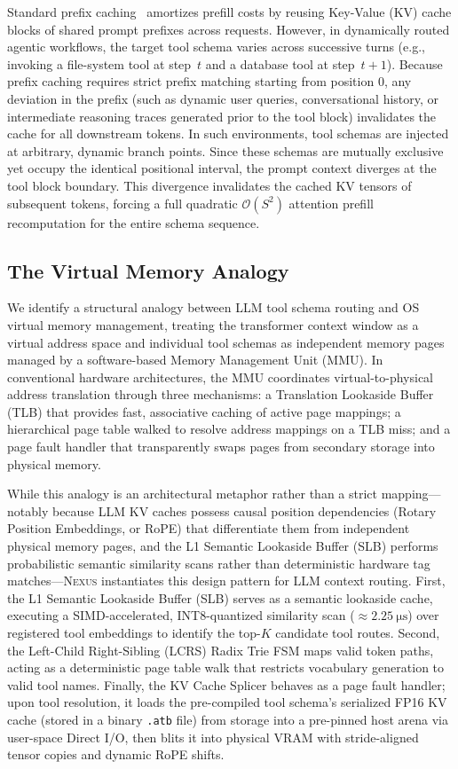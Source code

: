 \documentclass[conference,10pt]{IEEEtran}
\newcommand{\Nexus}{\textsc{Nexus}\xspace}
\newcommand{\atb}{\texttt{.atb}\xspace}
\begin{document}
Standard prefix caching~\cite{kwon2023vllm,zheng2024sglang} amortizes prefill
costs by reusing Key-Value (KV) cache blocks of shared prompt prefixes across requests.
However, in dynamically routed agentic workflows, the target tool schema varies
across successive turns (e.g., invoking a file-system tool at step~$t$ and a
database tool at step~$t{+}1$). Because prefix caching requires strict prefix matching starting from position 0, any deviation in the prefix (such as dynamic user queries, conversational history, or intermediate reasoning traces generated prior to the tool block) invalidates the cache for all downstream tokens. In such environments, tool schemas are injected at arbitrary, dynamic branch points. Since these schemas are mutually exclusive yet occupy the identical positional interval, the prompt context diverges at the tool block boundary. This divergence invalidates the cached KV tensors of subsequent tokens, forcing a full quadratic $\mathcal{O}(S^2)$ attention prefill recomputation for the entire schema sequence.

\subsection{The Virtual Memory Analogy}
\label{subsec:vm-analogy}

We identify a structural analogy between LLM tool schema routing and OS virtual memory
management, treating the transformer context window as a virtual address space and
individual tool schemas as independent memory pages managed by a software-based Memory
Management Unit (MMU). In conventional hardware architectures, the MMU coordinates
virtual-to-physical address translation through three mechanisms: a Translation Lookaside
Buffer (TLB) that provides fast, associative caching of active page mappings; a
hierarchical page table walked to resolve address mappings on a TLB miss; and a page
fault handler that transparently swaps pages from secondary storage into physical memory.

While this analogy is an architectural metaphor rather than a strict mapping---notably
because LLM KV caches possess causal position dependencies (Rotary Position Embeddings, or RoPE)
that differentiate them from independent physical memory pages, and the L1 Semantic
Lookaside Buffer (SLB) performs probabilistic semantic similarity scans rather than
deterministic hardware tag matches---\Nexus instantiates this design pattern for LLM
context routing. First, the L1 Semantic Lookaside Buffer (SLB) serves as a semantic
lookaside cache, executing a SIMD-accelerated, INT8-quantized similarity scan
($\approx \SI{2.25}{\micro\second}$) over registered tool embeddings to identify the top-$K$ candidate tool
routes. Second, the Left-Child Right-Sibling (LCRS) Radix Trie FSM maps valid token paths,
acting as a deterministic page table walk that restricts vocabulary generation to valid tool names.
Finally, the KV Cache Splicer behaves as a page fault handler; upon tool resolution, it loads the
pre-compiled tool schema's serialized FP16 KV cache (stored in a binary \atb file) from storage
into a pre-pinned host arena via user-space Direct I/O, then blits it into
physical VRAM with stride-aligned tensor copies and dynamic RoPE shifts.
\end{document}
